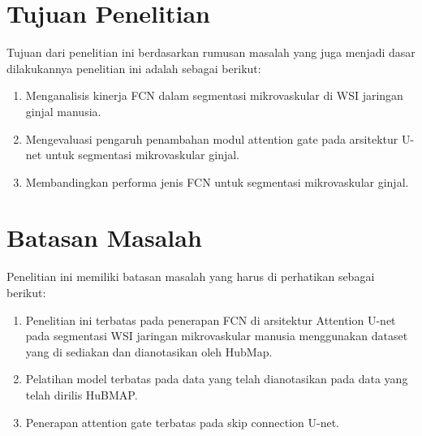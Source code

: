 \section{Tujuan Penelitian}

\noindent Tujuan dari penelitian ini berdasarkan rumusan masalah yang juga menjadi dasar dilakukannya penelitian ini adalah sebagai berikut:
\begin{enumerate}
    \item Menganalisis kinerja FCN dalam segmentasi mikrovaskular di WSI jaringan ginjal manusia.
    \item Mengevaluasi pengaruh penambahan modul attention gate pada arsitektur U-net untuk segmentasi mikrovaskular ginjal.
    \item Membandingkan performa jenis FCN untuk segmentasi mikrovaskular ginjal.
\end{enumerate}

\section{Batasan Masalah}
\noindent Penelitian ini memiliki batasan masalah yang harus di perhatikan sebagai berikut:
\begin{enumerate}
	\item Penelitian ini terbatas pada penerapan FCN di arsitektur Attention U-net pada segmentasi WSI jaringan mikrovaskular manusia menggunakan dataset yang di sediakan dan dianotasikan oleh HubMap.
	\item Pelatihan model terbatas pada data yang telah dianotasikan pada data yang telah dirilis HuBMAP.
	\item Penerapan attention gate terbatas pada skip connection U-net.
\end{enumerate}

